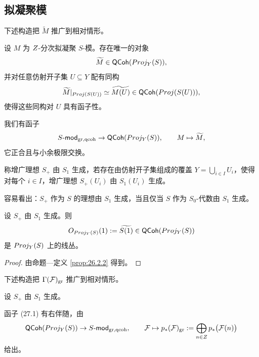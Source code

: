 \subsection{拟凝聚模}\label{sec:27.2}

下述构造把 $\widetilde{M}$ 推广到相对情形。

\begin{construction}\label{con:27.2.1}
设 $M$ 为 $Z$-分次拟凝聚 $S$-模。存在唯一的对象
\[
\widetilde{M} \in \mathsf{QCoh}(Proj_Y(S)),
\]
并对任意仿射开子集 $U \subseteq Y$ 配有同构
\[
\widetilde{M}|_{Proj(S(U))} \simeq \widetilde{M(U)} \in \mathsf{QCoh}(Proj(S(U))),
\]
使得这些同构对 $U$ 具有函子性。
\end{construction}

我们有函子
\begin{equation}\label{eq:27.1}
S\text{-}\mathsf{mod}_{\mathrm{gr},\mathrm{qcoh}} \to \mathsf{QCoh}(Proj_Y(S)), \qquad M \mapsto \widetilde{M},
\end{equation}
它正合且与小余极限交换。

\begin{definition}\label{def:27.2.2}
称增广理想 $S_+$ 由 $S_1$ 生成，若存在由仿射开子集组成的覆盖 $Y = \bigcup_{i \in I} U_i$，使得对每个 $i \in I$，增广理想 $S_+(U_i)$ 由 $S_1(U_i)$ 生成。
\end{definition}

\begin{remark}\label{rem:27.2.3}
容易看出：$S_+$ 作为 $S$ 的理想由 $S_1$ 生成，当且仅当 $S$ 作为 $S_0$-代数由 $S_1$ 生成。
\end{remark}

\begin{corollary}\label{cor:27.2.4}
设 $S_+$ 由 $S_1$ 生成。则
\[
O_{Proj_Y(S)}(1) := \widetilde{S(1)} \in \mathsf{QCoh}(Proj_Y(S))
\]
是 $Proj_Y(S)$ 上的线丛。
\end{corollary}

\begin{proof}
由命题—定义 \ref{prop:26.2.2} 得到。
\end{proof}

下述构造把 $\Gamma(\mathcal{F})_{\mathrm{gr}}$ 推广到相对情形。

\begin{construction}\label{con:27.2.5}
设 $S_+$ 由 $S_1$ 生成。

函子 (27.1) 有右伴随，由
\begin{equation}\label{eq:27.2}
\mathsf{QCoh}(Proj_Y(S)) \to S\text{-}\mathsf{mod}_{\mathrm{gr},\mathrm{qcoh}}, \qquad \mathcal{F} \mapsto p_*(\mathcal{F})_{\mathrm{gr}} := \bigoplus_{n \in Z} p_*\bigl(\mathcal{F}(n)\bigr)
\end{equation}
给出。
\end{construction}

